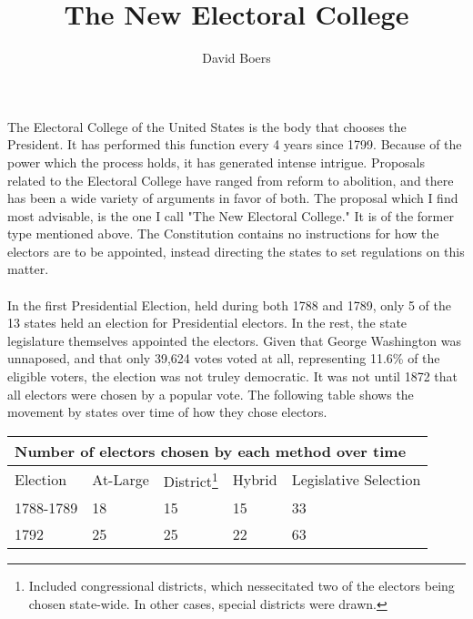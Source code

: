 \documentclass{article}
\title{The New Electoral College}
\author{David Boers}
\begin{document}
    \maketitle
    The Electoral College of the United States is the body that chooses the President. It has performed this function every 4 years since 1799. Because of the power which the process holds, it has generated intense intrigue. Proposals related to the Electoral College have ranged from reform to abolition, and there has been a wide variety of arguments in favor of both. The proposal which I find most advisable, is the one I call "The New Electoral College." It is of the former type mentioned above.
    The Constitution contains no instructions for how the electors are to be appointed, instead directing the states to set regulations on this matter.\\

    \\

    In the first Presidential Election, held during both 1788 and 1789, only 5 of the 13 states held an election for Presidential electors. In the rest, the state legislature themselves appointed the electors. Given that George Washington was unnaposed, and that only 39,624 votes voted at all, representing 11.6\% of the eligible voters, the election was not truley democratic. It was not until 1872 that all electors were chosen by a popular vote. The following table shows the movement by states over time of how they chose electors. 
    \begin{center} 
    \begin{tabular}{ |l|l|l|l|l| }
        \multicolumn{5}{|l|}{Number of electors chosen by each method over time} \\
        \hline
        Election & At-Large & District\footnote{Included congressional districts, which nessecitated two of the electors being chosen state-wide. In other cases, special districts were drawn.} & Hybrid & Legislative Selection \\
        \hline
        1788-1789 & 18 & 15 & 15 & 33 \\
        1792 & 25 & 25 & 22 & 63
    \end{tabular}
    \end{center} 
\end{document}
